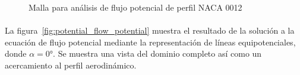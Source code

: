 \documentclass[letterpaper, openright, 12pt]{book}
\begin{document}
    \begin{figure}[htbp!]
        \centering

        \caption{Malla para análisis de flujo potencial de perfil NACA 0012}
        \label{fig:potential_flow_mesh}
    \end{figure}

    \paragraph*{}
    La figura~\ref{fig:potential_flow_potential} muestra el resultado de la
    solución a la ecuación de flujo potencial mediante la representación de
    líneas equipotenciales, donde $\alpha = 0\si{\degree}$. Se muestra una vista
    del dominio completo así como un acercamiento al perfil aerodinámico.
\end{document}
